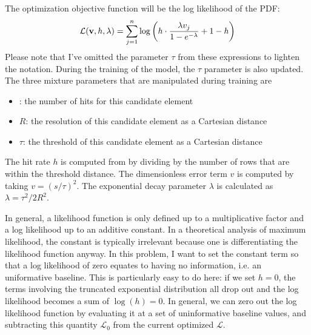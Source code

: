 The optimization objective function will be the log likelihood of the PDF:
$$ \mathcal{L}(\mathbf{v}, h, \lambda) = \sum_{j=1}^{n} \log \left( h \cdot \frac{\lambda v_j}{1 - e^{-\lambda}} + 1 - h \right)$$
Please note that I've omitted the parameter $\tau$ from these expressions to lighten the notation.
During the training of the model, the $\tau$ parameter is also updated.
The three mixture parameters that are manipulated during training are 
\begin{itemize}
\item {}: the number of hits for this candidate element
\item $R$: the resolution of this candidate element as a Cartesian distance
\item $\tau$: the threshold of this candidate element as a Cartesian distance
\end{itemize}
The hit rate $h$ is computed from  by dividing by the number of rows that are within the threshold distance.
The dimensionless error term $v$ is computed by taking $v = (s/\tau)^2$.
The exponential decay parameter $\lambda$ is calculated as $\lambda = \tau^2 / 2R^2$.

In general, a likelihood function is only defined up to a multiplicative factor and a log likelihood up to an additive constant.
In a theoretical analysis of maximum likelihood, the constant is typically irrelevant because one is differentiating the likelihood function anyway.
In this problem, I want to set the constant term so that a log likelihood of zero equates to having no information,
i.e. an uniformative baseline.
This is particularly easy to do here: if we set $h=0$, the terms involving the truncated exponential distribution all drop out 
and the log likelihood becomes a sum of $\log(h) = 0$.
In general, we can zero out the log likelihood function by evaluating it at a set of uninformative baseline values, 
and subtracting this quantity $\mathcal{L}_0$ from the current optimized $\mathcal{L}$.

